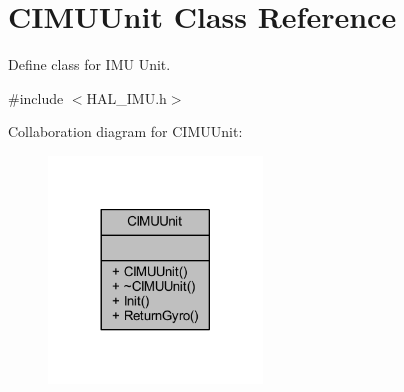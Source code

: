 \hypertarget{class_c_i_m_u_unit}{}\section{C\+I\+M\+U\+Unit Class Reference}
\label{class_c_i_m_u_unit}


Define class for I\+MU Unit.  




{\ttfamily \#include $<$H\+A\+L\+\_\+\+I\+M\+U.\+h$>$}



Collaboration diagram for C\+I\+M\+U\+Unit\+:
\nopagebreak
\begin{figure}[H]
\begin{center}
\leavevmode
\includegraphics[width=161pt]{class_c_i_m_u_unit__coll__graph}
\end{center}
\end{figure}
